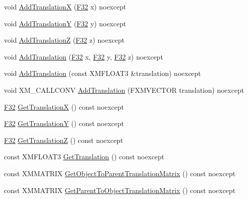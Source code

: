 \begin{DoxyCompactItemize}
\item 
void \hyperlink{structmage_1_1_transform_node_afa141e560ed1a40080be42bc96cc21cc}{Add\+TranslationX} (\hyperlink{namespacemage_aa97e833b45f06d60a0a9c4fc22ae02c0}{F32} x) noexcept
\item 
void \hyperlink{structmage_1_1_transform_node_a0aed339bffcf6bffd1be495617b9f6d9}{Add\+TranslationY} (\hyperlink{namespacemage_aa97e833b45f06d60a0a9c4fc22ae02c0}{F32} y) noexcept
\item 
void \hyperlink{structmage_1_1_transform_node_a5baeb0e01284996939f5338c8d3fe2dc}{Add\+TranslationZ} (\hyperlink{namespacemage_aa97e833b45f06d60a0a9c4fc22ae02c0}{F32} z) noexcept
\item 
void \hyperlink{structmage_1_1_transform_node_a14c69b375da244d14e0f253ff217785d}{Add\+Translation} (\hyperlink{namespacemage_aa97e833b45f06d60a0a9c4fc22ae02c0}{F32} x, \hyperlink{namespacemage_aa97e833b45f06d60a0a9c4fc22ae02c0}{F32} y, \hyperlink{namespacemage_aa97e833b45f06d60a0a9c4fc22ae02c0}{F32} z) noexcept
\item 
void \hyperlink{structmage_1_1_transform_node_a8310335915abb6583bbae4aa2a0e3b20}{Add\+Translation} (const X\+M\+F\+L\+O\+A\+T3 \&translation) noexcept
\item 
void X\+M\+\_\+\+C\+A\+L\+L\+C\+O\+NV \hyperlink{structmage_1_1_transform_node_aa1241519dfcb8179d4564847e20c1c2c}{Add\+Translation} (F\+X\+M\+V\+E\+C\+T\+OR translation) noexcept
\item 
\hyperlink{namespacemage_aa97e833b45f06d60a0a9c4fc22ae02c0}{F32} \hyperlink{structmage_1_1_transform_node_a62d6ef7ab4fb3b9e550990655655ed5b}{Get\+TranslationX} () const noexcept
\item 
\hyperlink{namespacemage_aa97e833b45f06d60a0a9c4fc22ae02c0}{F32} \hyperlink{structmage_1_1_transform_node_aedabfc6152a5ad5775cbb10fec790b07}{Get\+TranslationY} () const noexcept
\item 
\hyperlink{namespacemage_aa97e833b45f06d60a0a9c4fc22ae02c0}{F32} \hyperlink{structmage_1_1_transform_node_a2c34908570c0d84f9312462a0cc255c7}{Get\+TranslationZ} () const noexcept
\item 
const X\+M\+F\+L\+O\+A\+T3 \hyperlink{structmage_1_1_transform_node_a98da5fb59f03d37a615a9846e5f5e926}{Get\+Translation} () const noexcept
\item 
const X\+M\+M\+A\+T\+R\+IX \hyperlink{structmage_1_1_transform_node_a32c025e3ded200decae648f7e249dfe2}{Get\+Object\+To\+Parent\+Translation\+Matrix} () const noexcept
\item 
const X\+M\+M\+A\+T\+R\+IX \hyperlink{structmage_1_1_transform_node_a11feea92825b1b537940cd8105edd801}{Get\+Parent\+To\+Object\+Translation\+Matrix} () const noexcept

\end{DoxyCompactItemize}
